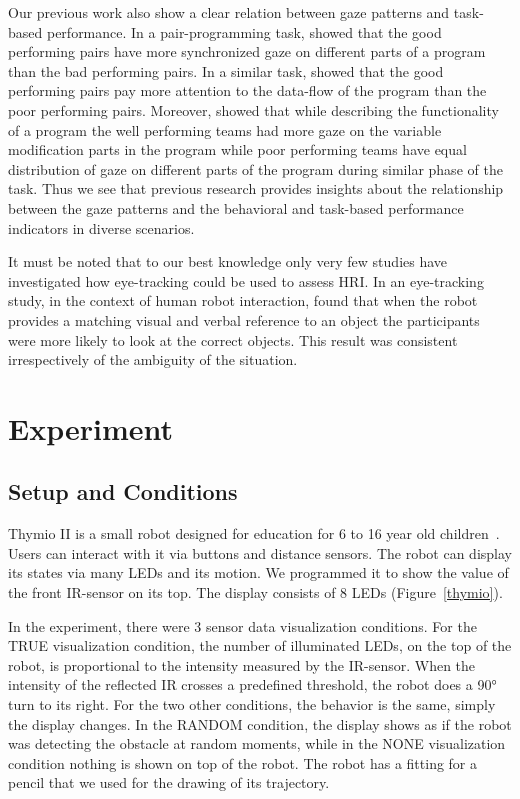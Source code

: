 \documentclass{sig-alternate}
\begin{document}
Our previous work also show a clear relation between gaze patterns and
task-based performance. In a pair-programming task, \cite{jermann2012effects}
showed that the good performing pairs have more synchronized gaze on different
parts of a program than the bad performing pairs. In a similar task,
\cite{sharma2012gaze} showed that the good performing pairs pay more attention
to the data-flow of the program than the poor performing pairs. Moreover,
\cite{sharma2013understanding} showed that while describing the functionality of
a program the well performing teams had more gaze on the variable modification
parts in the program while poor performing teams have equal distribution of gaze
on different parts of the program during similar phase of the task.  Thus we see
that previous research provides insights about the relationship between the gaze
patterns and the behavioral and task-based performance indicators in diverse
scenarios.

It must be noted that to our best knowledge only very few studies have
investigated how eye-tracking could be used to assess HRI. In an eye-tracking
study, in the context of human robot interaction, \cite{staudte2009visual} found
that when the robot provides a matching visual and verbal reference to an object
the participants were more likely to look at the correct objects. This result
was consistent irrespectively of the ambiguity of the situation.



\section{Experiment}

\subsection{Setup and Conditions}

Thymio II is a small robot designed for education for 6 to 16 year old
children~\cite{magnenat2012programming, riedo2012two}. Users can interact with
it via buttons and distance sensors. The robot can display its states via many
LEDs and its motion. We programmed it to show the value of the front IR-sensor
on its top. The display consists of 8 LEDs (Figure~\ref{thymio}).

In the experiment, there were 3 sensor data visualization conditions.  For the
{\sf TRUE} visualization condition, the number of illuminated LEDs, on the top of the
robot, is proportional to the intensity measured by the IR-sensor. When the
intensity of the reflected IR crosses a predefined threshold, the robot does a
90° turn to its right. For the two other conditions, the behavior is the same,
simply the display changes. In the {\sf RANDOM} condition, the display shows as if the
robot was detecting the obstacle at random moments, while in the {\sf NONE}
visualization condition nothing is shown on top of the robot. The robot has a
fitting for a pencil that we used for the drawing of its trajectory.
\end{document}

